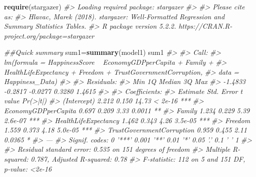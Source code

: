 \documentclass[]{book}
\newenvironment{Shaded}{\begin{snugshade}}{\end{snugshade}}
\newcommand{\CommentTok}[1]{\textcolor[rgb]{0.56,0.35,0.01}{\textit{#1}}}
\newcommand{\KeywordTok}[1]{\textcolor[rgb]{0.13,0.29,0.53}{\textbf{#1}}}
\newcommand{\NormalTok}[1]{#1}
\begin{document}
\begin{Shaded}
\begin{Highlighting}[]
\KeywordTok{require}\NormalTok{(stargazer)}
\CommentTok{#> Loading required package: stargazer}
\CommentTok{#> }
\CommentTok{#> Please cite as:}
\CommentTok{#>  Hlavac, Marek (2018). stargazer: Well-Formatted Regression and Summary Statistics Tables.}
\CommentTok{#>  R package version 5.2.2. https://CRAN.R-project.org/package=stargazer}

\CommentTok{##Quick summary}
\NormalTok{sum1=}\KeywordTok{summary}\NormalTok{(model1)}
\NormalTok{sum1}
\CommentTok{#> }
\CommentTok{#> Call:}
\CommentTok{#> lm(formula = HappinessScore ~ EconomyGDPperCapita + Family + }
\CommentTok{#>     HealthLifeExpectancy + Freedom + TrustGovernmentCorruption, }
\CommentTok{#>     data = Happiness_Data)}
\CommentTok{#> }
\CommentTok{#> Residuals:}
\CommentTok{#>     Min      1Q  Median      3Q     Max }
\CommentTok{#> -1.4833 -0.2817 -0.0277  0.3280  1.4615 }
\CommentTok{#> }
\CommentTok{#> Coefficients:}
\CommentTok{#>                           Estimate Std. Error t value Pr(>|t|)    }
\CommentTok{#> (Intercept)                  2.212      0.150   14.73  < 2e-16 ***}
\CommentTok{#> EconomyGDPperCapita          0.697      0.209    3.33   0.0011 ** }
\CommentTok{#> Family                       1.234      0.229    5.39  2.6e-07 ***}
\CommentTok{#> HealthLifeExpectancy         1.462      0.343    4.26  3.5e-05 ***}
\CommentTok{#> Freedom                      1.559      0.373    4.18  5.0e-05 ***}
\CommentTok{#> TrustGovernmentCorruption    0.959      0.455    2.11   0.0365 *  }
\CommentTok{#> ---}
\CommentTok{#> Signif. codes:  0 '***' 0.001 '**' 0.01 '*' 0.05 '.' 0.1 ' ' 1}
\CommentTok{#> }
\CommentTok{#> Residual standard error: 0.535 on 151 degrees of freedom}
\CommentTok{#> Multiple R-squared:  0.787,  Adjusted R-squared:  0.78 }
\CommentTok{#> F-statistic:  112 on 5 and 151 DF,  p-value: <2e-16}


\end{Highlighting}
\end{Shaded}
\end{document}
